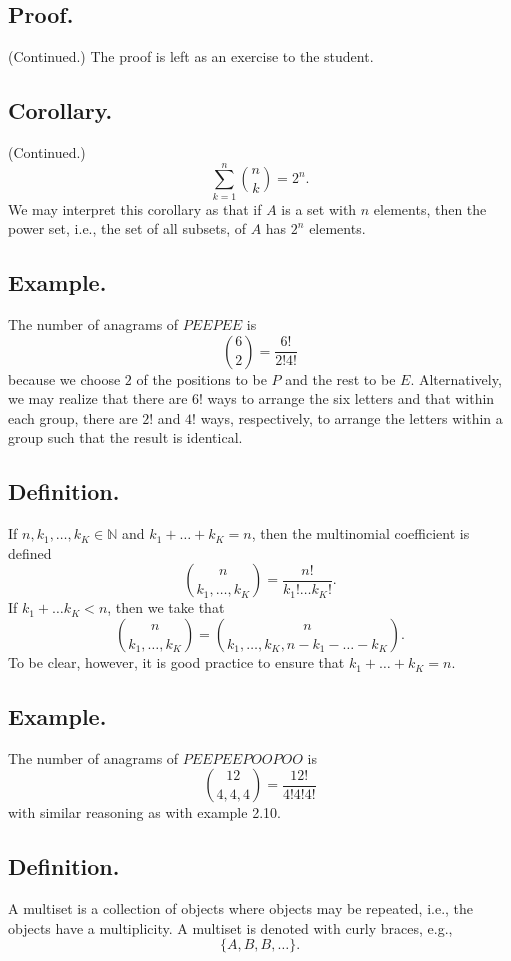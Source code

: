 \documentclass[titlepage]{article}
\begin{document}
\subsection{Proof.} (Continued.) The proof is left as an exercise to the student.

\subsection{Corollary.} (Continued.)
$$\sum_{k=1}^{n}\binom{n}{k} = 2^{n}.$$
We may interpret this corollary as that if $A$ is a set with $n$ elements, then the power set, i.e., the set of all subsets, of $A$ has $2^{n}$ elements.

\subsection{Example.} The number of anagrams of $PEEPEE$ is 
$$\binom{6}{2} = \frac{6!}{2!4!}$$
because we choose $2$ of the positions to be $P$ and the rest to be $E$. Alternatively, we may realize that there are $6!$ ways to arrange the six letters and that within each group, there are $2!$ and $4!$ ways, respectively, to arrange the letters within a group such that the result is identical.

\subsection{Definition.} If $n, k_{1}, \ldots, k_{K} \in \mathbb{N}$ and $k_{1} + \ldots + k_{K} = n$, then the multinomial coefficient is defined 
$$\binom{n}{k_{1},\ldots,k_{K}} = \frac{n!}{k_{1}!\ldots k_{K}!}.$$
If $k_{1} + \ldots k_{K} < n$, then we take that 
$$\binom{n}{k_{1},\ldots,k_{K}} = \binom{n}{k_{1},\ldots,k_{K},n-k_{1}-\ldots-k_{K}}.$$
To be clear, however, it is good practice to ensure that $k_{1} + \ldots + k_{K} = n$.

\subsection{Example.} The number of anagrams of $PEEPEEPOOPOO$ is 
$$\binom{12}{4,4,4} = \frac{12!}{4!4!4!}$$
with similar reasoning as with example 2.10.

\subsection{Definition.} A multiset is a collection of objects where objects may be repeated, i.e., the objects have a multiplicity. A multiset is denoted with curly braces, e.g.,  
$$\{A, B, B, \ldots\}.$$
\end{document}
